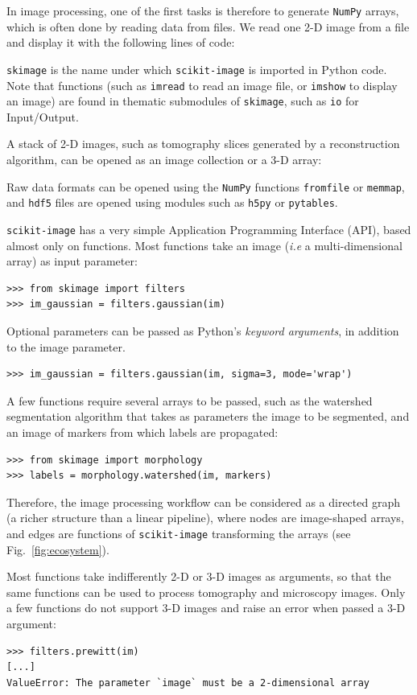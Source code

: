 \documentclass[twocolumn]{bmcart}%
\begin{document}
In image processing, one of the first tasks is therefore to generate
\texttt{NumPy} arrays, which is often done by reading data from files. We
read one 2-D image from a file and display it with the following lines of code:

 

\texttt{skimage} is the name under which \texttt{scikit-image} is imported in
Python code. Note that functions (such as \texttt{imread} to read an image
file, or \texttt{imshow} to display an image) are found in thematic submodules of
\texttt{skimage}, such as \texttt{io} for Input/Output. 

A stack of 2-D images, such as tomography slices generated by a reconstruction algorithm, can be opened as an image collection or a 3-D array:

Raw data formats can be opened using the \texttt{NumPy} functions \texttt{fromfile} or \texttt{memmap}, and \texttt{hdf5} files are opened using modules such as \texttt{h5py} or \texttt{pytables}.

\texttt{scikit-image} has a very simple Application Programming Interface
(API), based almost only on
functions. Most functions take an image (\emph{i.e} a multi-dimensional
array) as input parameter:
\begin{lstlisting}
>>> from skimage import filters
>>> im_gaussian = filters.gaussian(im)
\end{lstlisting}

Optional parameters can be passed as Python's \emph{keyword arguments},
in addition to the image parameter.
\begin{lstlisting}
>>> im_gaussian = filters.gaussian(im, sigma=3, mode='wrap')
\end{lstlisting}
A few functions require several arrays to be passed, such as the
watershed segmentation algorithm that takes as parameters the image to be
segmented, and an image of markers from which labels are propagated:
\begin{lstlisting}
>>> from skimage import morphology
>>> labels = morphology.watershed(im, markers)
\end{lstlisting}
Therefore, the image processing workflow can be considered as a directed graph
(a richer structure than a linear pipeline), where nodes are image-shaped arrays, and
edges are functions of \texttt{scikit-image} transforming the arrays (see
Fig.~\ref{fig:ecosystem}).

Most functions take indifferently 2-D or 3-D images as arguments, so that
the same functions can be used to process tomography and microscopy
images. Only a few functions do not support 3-D images and raise an error
when passed a 3-D argument:
\begin{lstlisting}
>>> filters.prewitt(im)
[...]
ValueError: The parameter `image` must be a 2-dimensional array
\end{lstlisting}
\end{document}
